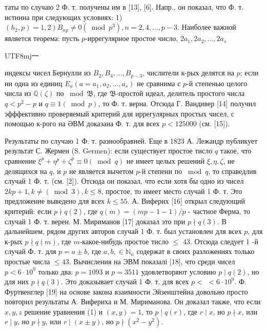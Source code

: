 \documentclass[10pt]{article}
\begin{document}
таты по случаю 2 Ф. т. получены им в [13], [6]. Напр., он показал, что Ф. т. истинна при следующих условиях: 1) $\left.\left(h_{2}, p\right)=1,2\right) B_{n p} \neq 0\left(\bmod p^{3}\right), n=2,4, \ldots, p-3$. Наиболее важной является теорема: пусть $p$-иррегулярное простое число, $2 a_{1}, 2 a_{2}, \ldots, 2 a_{s}$ \begin{CJK}{UTF8}{mj}一\end{CJK}индексы чисел Бернулли из $B_{2}, B_{4}, \ldots, B_{p-3}$, числители к-рых делятся на $p$; если ни одна из единиц $E_{a}\left(a=a_{1}, a_{2}, \ldots, a_{s}\right)$ не сравнима с $p$-й степенью целого числа из $\mathbb{Q}(\zeta)$ по $\bmod \mathfrak{B}$, где $\mathfrak{B}$-простой идеал, делитель простого числа $q<p^{2}-p$ и $q \equiv 1(\bmod p)$, то Ф. т. верна. Отсюда Г. Вандивер [14] получил эфффективно проверяемый критерий для иррегулярных простых чисел, с помощью к-рого на ӘВМ доказана Ф. т. для всех $p<125000$ (см. [15]).



Результаты по случаю 1 Ф. т. разнообравней. Еще в 1823 А. Лежандр публикует результат С. Жермен (S. Germen): если существует простое тисло $q$ такое, что сравнение $\xi^{p}+\eta^{p}+\zeta^{p} \equiv 0(\bmod q)$ не имеет целых решений $\xi, \eta, \zeta$, не делящихся на $q$, и $p$ не является вычетом $p$-й степени по $\bmod q$, то справедлив случай 1 Ф. т. (см. [2]). Отсюда он показал, что если хотя бы одно из чисел $2 k p+1, k \neq(\bmod 3), k \leqslant 8$, простое, то имеет место случай 1 Ф. т. Это предложение выведено для всех $k \leqslant 55$. А. Виферих [16] открыл следующий критерий: если $p \nmid q(2)$, где $q(m)=(m p-1-1) / p$ - частное Ферма, то случай 1 Ф. т. верен. М. Мириманов [17] доказал это при $p \nmid q(3)$. В дальнейшем, рядом других авторов случай 1 Ф. т. был установлен для всех $p$, для к-рых $p \nmid q(m)$, где $m$-какое-нибудь простое тисло $\leqslant$ 43. Отсюда следует 1 -й случай Ф. т. для $p=a \pm b$, где $a, b, \in \mathbb{N}_{n}$ содержат в своих разложениях только простые числа $\leqslant 43$. Вычисления на ЭВМ показалі [18], что среди чисел $p<6 \cdot 10^{9}$ только два: $p=1093$ и $p=3511$ удовлетворяют условию $p \mid q(2)$, но для них $p \nmid q(3)$. Это доказывает случай 1 Ф. т. для всех $p<$ $<6 \cdot 10^{9}$. Ф. Фуртвенглер [19] на основе закона взаимности Эйзенштейна довольно просто повторил результаты А. Вифериха и М. Мириманова. Он доказал также, что если $x, y, z$ решение уравнения (1) и $(x, y)=1$, то $p \mid q(r)$, где $r \mid x$, но $p \nmid x$, или $r \mid y$, но $p \nmid y$, или $r \mid(x \pm y)$, но $p \nmid\left(x^{2}-y^{2}\right)$.
\end{document}
